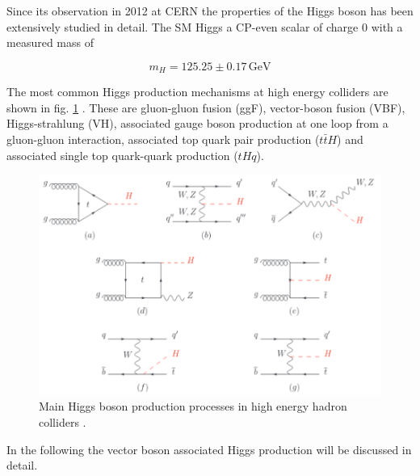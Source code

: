 Since its observation in 2012 at CERN \cite{Chatrchyan_2012} the properties of the Higgs boson has been extensively studied in detail. The SM Higgs a CP-even scalar of charge 0 with a measured mass of

\begin{equation*}
	m_H = 125.25 \pm 0.17 \, \text{GeV}
\end{equation*}

The most common Higgs production mechanisms at high energy colliders are shown in fig. \ref{fig:higgsproduction} \cite{Workman:2022ynf}. These are gluon-gluon fusion (ggF), vector-boson fusion (VBF), Higgs-strahlung (VH), associated gauge boson production at one loop from a gluon-gluon interaction, associated top quark pair production ($t\bar{t}H$) and associated single top quark-quark production ($tHq$).

\begin{figure}[h!]
	\centering
	\includegraphics[width=0.8\linewidth]{figures/theory/higgsproduction.png}
	\caption{Main Higgs boson production processes in high energy hadron colliders \cite{Workman:2022ynf}.}
	\label{fig:higgsproduction}
\end{figure}

In the following the vector boson associated Higgs production will be discussed in detail.

